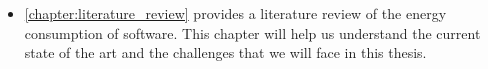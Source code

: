 \begin{itemize}
    \item \cref{chapter:literature_review} provides a literature review of the energy consumption of software. This chapter will help us understand the current state of the art and the challenges that we will face in this thesis.
\end{itemize}







